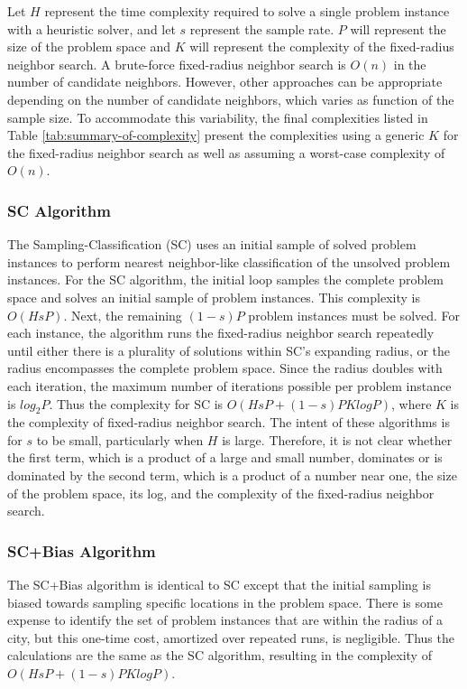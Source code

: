 Let $H$ represent the time complexity required to solve a single problem instance with a heuristic solver, and let $s$ represent the sample rate.  $P$ will represent the size of the problem space and $K$ will represent the complexity of the fixed-radius neighbor search.  A brute-force fixed-radius neighbor search is $O(n)$ in the number of candidate neighbors.  However, other approaches can be appropriate depending on the number of candidate neighbors, which varies as function of the sample size.  To accommodate this variability, the final complexities listed in Table \ref{tab:summary-of-complexity} present the complexities using a generic $K$ for the fixed-radius neighbor search as well as assuming a worst-case complexity of  $O(n)$.

\subsubsection{SC Algorithm} The Sampling-Classification (SC) uses an initial sample of solved problem instances to perform nearest neighbor-like classification of the unsolved problem instances.  For the SC algorithm, the initial loop samples the complete problem space and solves an initial sample of problem instances.  This complexity is $O(HsP)$.  Next, the remaining $(1-s)P$ problem instances must be solved.  For each instance, the algorithm runs the fixed-radius neighbor search repeatedly until either there is a plurality of solutions within SC's expanding radius, or the radius encompasses the complete problem space.  Since the radius doubles with each iteration, the maximum number of iterations possible per problem instance is $log_2P$.  Thus the complexity for SC is $O(HsP + (1-s)PKlogP)$, where $K$ is the complexity of fixed-radius neighbor search.  The intent of these algorithms is for $s$ to be small, particularly when $H$ is large.  Therefore, it is not clear whether the first term, which is a product of a large and small number, dominates or is dominated by the second term, which is a product of a number near one, the size of the problem space, its log, and the complexity of the fixed-radius neighbor search.

\subsubsection{SC+Bias Algorithm} The SC+Bias algorithm is identical to SC except that the initial  sampling is biased towards sampling specific locations in the problem space. There is some expense to identify the set of problem instances that are within the radius of a city, but this one-time cost, amortized over repeated runs, is negligible.  Thus the calculations are the same as the SC algorithm, resulting in the complexity of $O(HsP + (1-s)PKlogP)$.

